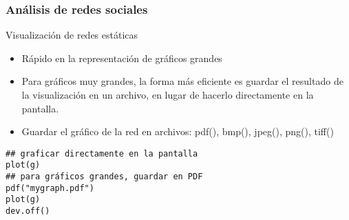 \documentclass[11pt]{beamer}
\begin{document}
\begin{frame}[fragile]
 \frametitle{Análisis de redes sociales} 
Visualización de redes estáticas
 \begin{itemize}
       \item Rápido en la representación de gráficos grandes
\item Para gráficos muy grandes, la forma más eficiente es guardar el resultado de la visualización en un archivo, en lugar de hacerlo directamente en la pantalla.
\item Guardar el gráfico de la red en archivos: pdf(), bmp(), jpeg(),
png(), tiff()
   \end{itemize} 
    \begin{verbatim}
## graficar directamente en la pantalla
plot(g)
## para gráficos grandes, guardar en PDF
pdf("mygraph.pdf")
plot(g)
dev.off() 
    \end{verbatim}
\end{frame}
\end{document}
